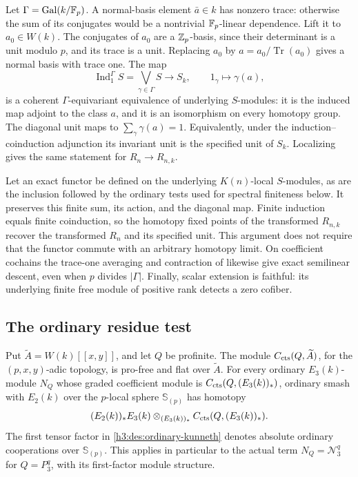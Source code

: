 Let \(\Gamma=\operatorname{Gal}(k/\mathbb F_p)\).  A normal-basis element \(\bar a\in k\)
has nonzero trace: otherwise the sum of its conjugates would be a
nontrivial \(\mathbb F_p\)-linear dependence.  Lift it to \(a_0\in W(k)\).
The conjugates of \(a_0\) are a \(\mathbb Z_p\)-basis, since their determinant
is a unit modulo \(p\), and its trace is a unit.  Replacing \(a_0\) by
\(a=a_0/\operatorname{Tr}(a_0)\) gives a normal basis with trace one.
The map
\[
 \operatorname{Ind}_{1}^{\Gamma}S=\bigvee_{\gamma\in\Gamma}S
       \longrightarrow S_k,
 \qquad 1_\gamma\longmapsto\gamma(a),
\]
is a coherent \(\Gamma\)-equivariant equivalence of underlying
\(S\)-modules: it is the induced map adjoint to the class \(a\), and
it is an isomorphism on every homotopy group.  The diagonal unit maps
to \(\sum_\gamma\gamma(a)=1\).  Equivalently, under the
induction--coinduction adjunction its invariant unit is the specified
unit of \(S_k\).  Localizing gives the same statement for
\(R_n\to R_{n,k}\).

Let an exact functor be defined on the underlying \(K(n)\)-local
\(S\)-modules, as are the inclusion followed by the ordinary tests
used for spectral finiteness below.  It preserves this finite sum, its
action, and the diagonal map.  Finite induction equals finite
coinduction, so the homotopy fixed points of the transformed
\(R_{n,k}\) recover the transformed \(R_n\) and its specified unit.  This argument does not require that the functor
commute with an arbitrary homotopy limit.  On coefficient cochains the
trace-one averaging and contraction of
 likewise give exact semilinear descent,
even when \(p\) divides \(|\Gamma|\).  Finally, scalar extension is
faithful: its underlying finite free module of positive rank detects
a zero cofiber.

\subsection{The ordinary residue test}

\begin{lemma}\label{h3:des:flat-functions}
Put \(\widetilde A=W(k)[[x,y]]\), and let \(Q\) be profinite.
The module \(C_{\mathrm{cts}}(Q,\widetilde A)\), for the
\((p,x,y)\)-adic topology, is pro-free and flat over
\(\widetilde A\).  For every ordinary \(E_3(k)\)-module \(N_Q\) whose graded
coefficient module is \(C_{\mathrm{cts}}(Q,(E_3(k))_*)\), ordinary
smash with \(E_2(k)\) over
the \(p\)-local sphere \(\mathbb S_{(p)}\) has homotopy
\begin{equation}\label{h3:des:ordinary-kunneth}
 (E_2(k))_*E_3(k)\otimes_{(E_3(k))_*}
 C_{\mathrm{cts}}(Q,(E_3(k))_*).
\end{equation}
The first tensor factor in \eqref{h3:des:ordinary-kunneth} denotes
absolute ordinary cooperations over \(\mathbb S_{(p)}\).  This applies
in particular to the actual term \(N_Q=\mathcal N_3^q\) for
\(Q=P_3^q\), with its first-factor module structure.
\end{lemma}

